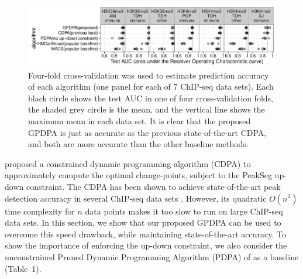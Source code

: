\documentclass{article}
\begin{document}
\begin{figure}[b!]
  \centering
  \includegraphics[width=\textwidth]{figure-test-error-dots}
  \vskip -0.5cm
  \caption{Four-fold cross-validation was used to estimate prediction
    accuracy of each algorithm (one panel for each of 7 ChIP-seq data sets). 
Each black circle shows the test AUC in one of four
    cross-validation folds, the shaded grey circle is the mean, and
    the vertical line shows the maximum mean in each data set. It is
    clear that the proposed GPDPA is
    just as accurate as the previous state-of-the-art CDPA, and both are
    more accurate than the other baseline methods. 
  }
  \label{fig:test-error-dots}
\end{figure}

\citet{HOCKING-PeakSeg} proposed a constrained dynamic programming
algorithm (CDPA) to approximately compute the optimal change-points,
subject to the PeakSeg up-down constraint. The CDPA has been shown to
achieve state-of-the-art peak detection accuracy in several ChIP-seq
data sets \citep{HOCKING2016-chipseq}. However, its quadratic $O(n^2)$
time complexity for $n$ data points makes it too slow to run on large
ChIP-seq data sets. In this section, we show that our proposed GPDPA
can be used to overcome this speed drawback, while maintaining
state-of-the-art accuracy. To show the importance of enforcing the
up-down constraint, we also consider the unconstrained Pruned Dynamic
Programming Algorithm (PDPA) of \citet{pruned-dp} as a baseline
(Table~1).
\end{document}

